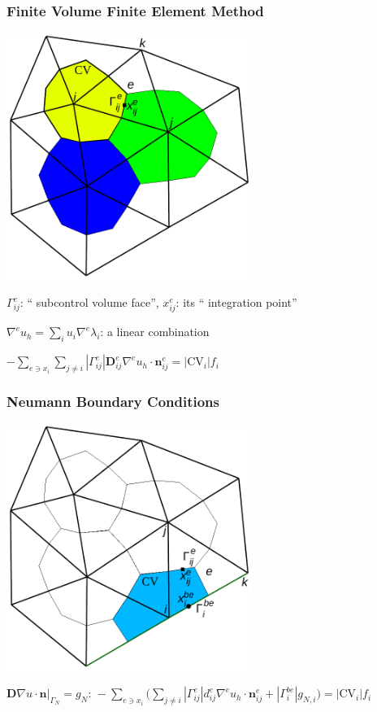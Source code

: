 \begin {frame} [t]
\frametitle{Finite Volume Finite Element Method}
\centerline{\includegraphics [width=0.6\textwidth] {FV-Elem-Donald.pdf}}
{%
\centerline{$\Gamma^{e}_{ij}$: ``{\color{blue} subcontrol volume face}'', $x^{e}_{ij}$: its ``{\color{blue} integration point}''}
}%
{%
\centerline{$\displaystyle \nabla^e u_h = \sum_i u_i \nabla^e \lambda_i$: a linear combination}
}%
{%
\centerline{$\displaystyle - \sum_{e \ni x_i} \sum_{j \ne i} | \Gamma^e_{ij} | \mathbf{D}^e_{ij} \nabla^e u_h \cdot \mathbf{n}^e_{ij} = | \mathrm{CV}_i | f_i$}
}%
\end {frame}

\begin{frame} [t]
\frametitle {Neumann Boundary Conditions}
\centerline{\includegraphics [width=0.6\textwidth] {FV-Elem-Donald-bnd.pdf}}
\centerline{%
$
 \left .  \mathbf{D} \nabla u \cdot \mathbf{n} \right |_{\Gamma_N} = g_N: \,
 \displaystyle
 - \sum_{e \ni x_i}
  \bigl (
   \sum_{j \ne i} | \Gamma^e_{ij} | d^e_{ij} \nabla^e u_h \cdot \mathbf{n}^e_{ij}
   +
   | \Gamma^{be}_{i} | g_{N,i}
  \bigr )
 = | \mathrm{CV}_i | f_i
$%
}
\end{frame}

